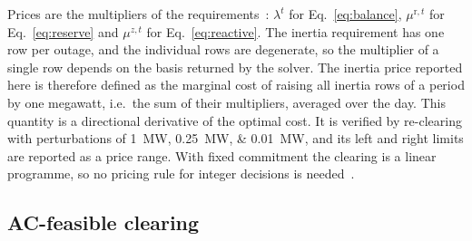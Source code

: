Prices are the multipliers of the requirements~\cite{schweppe1988spot}:
$\lambda^t$ for Eq.~\eqref{eq:balance}, $\mu^{\mathrm{r},t}$ for
Eq.~\eqref{eq:reserve} and $\mu^{z,t}$ for Eq.~\eqref{eq:reactive}. The
inertia requirement has one row per outage, and the individual rows are
degenerate, so the multiplier of a single row depends on the basis returned by
the solver. The inertia price reported here is therefore defined as the
marginal cost of raising all inertia rows of a period by one megawatt, i.e.\
the sum of their multipliers, averaged over the day. This quantity is a
directional derivative of the optimal cost. It is verified by re-clearing with
perturbations of \SIlist{1;0.25;0.01}{\MW}, and its left and right limits are
reported as a price range. With fixed commitment
the clearing is a linear programme, so no pricing rule for integer decisions
is needed~\cite{oneill2005efficient,gribik2007market}.

\subsection{AC-feasible clearing}
\label{sec:acloop}

